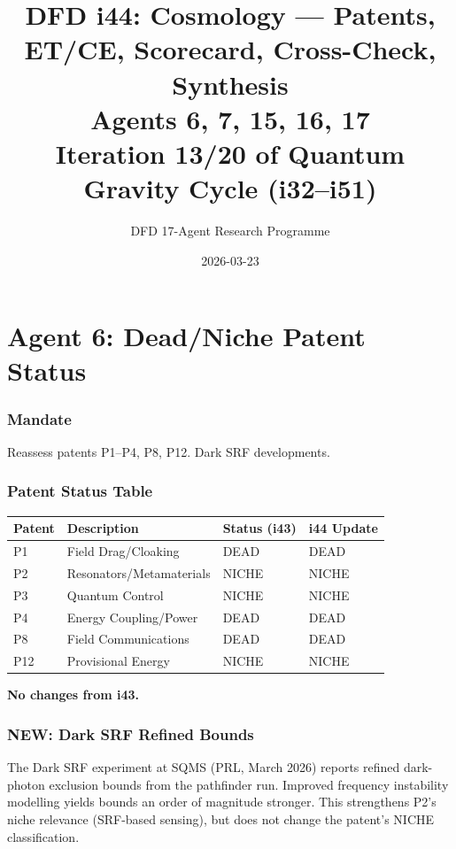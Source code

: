 \documentclass[11pt,a4paper]{article}
\title{DFD i44: Cosmology --- Patents, ET/CE, Scorecard, Cross-Check, Synthesis\\[6pt]
\large Agents 6, 7, 15, 16, 17\\[6pt]
\normalsize Iteration 13/20 of Quantum Gravity Cycle (i32--i51)}
\author{DFD 17-Agent Research Programme}
\date{2026-03-23}
\newcommand{\NEW}{\textcolor{dfdblue}{\textbf{NEW}}}
\begin{document}
\maketitle
\tableofcontents
\newpage

\part{Agent 6: Dead/Niche Patent Status}
\label{part:agent6}

\section{Mandate}

Reassess patents P1--P4, P8, P12. Dark SRF developments.

\section{Patent Status Table}

\begin{center}
\begin{tabular}{llll}
\toprule
\textbf{Patent} & \textbf{Description} & \textbf{Status (i43)} & \textbf{i44 Update} \\
\midrule
P1 & Field Drag/Cloaking & DEAD & DEAD \\
P2 & Resonators/Metamaterials & NICHE & NICHE \\
P3 & Quantum Control & NICHE & NICHE \\
P4 & Energy Coupling/Power & DEAD & DEAD \\
P8 & Field Communications & DEAD & DEAD \\
P12 & Provisional Energy & NICHE & NICHE \\
\bottomrule
\end{tabular}
\end{center}

\textbf{No changes from i43.}

\section{\NEW: Dark SRF Refined Bounds}

The Dark SRF experiment at SQMS (PRL, March 2026) reports refined dark-photon exclusion bounds from the pathfinder run. Improved frequency instability modelling yields bounds an order of magnitude stronger. This strengthens P2's niche relevance (SRF-based sensing), but does not change the patent's NICHE classification.
\end{document}
